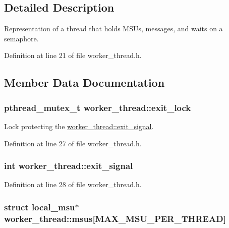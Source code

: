 \subsection{Detailed Description}
Representation of a thread that holds M\-S\-Us, messages, and waits on a semaphore. 

Definition at line 21 of file worker\-\_\-thread.\-h.



\subsection{Member Data Documentation}
\hypertarget{structworker__thread_a92b93bfd566a2cef147993fd851beb30}{
\subsubsection[{exit\-\_\-lock}]{\setlength{\rightskip}{0pt plus 5cm}pthread\-\_\-mutex\-\_\-t worker\-\_\-thread\-::exit\-\_\-lock}}\label{structworker__thread_a92b93bfd566a2cef147993fd851beb30}


Lock protecting the \hyperlink{structworker__thread_a671b6ce2bdb562ebb744b9bcf6764e64}{worker\-\_\-thread\-::exit\-\_\-signal}. 



Definition at line 27 of file worker\-\_\-thread.\-h.

\hypertarget{structworker__thread_a671b6ce2bdb562ebb744b9bcf6764e64}{
\subsubsection[{exit\-\_\-signal}]{\setlength{\rightskip}{0pt plus 5cm}int worker\-\_\-thread\-::exit\-\_\-signal}}\label{structworker__thread_a671b6ce2bdb562ebb744b9bcf6764e64}


Definition at line 28 of file worker\-\_\-thread.\-h.

\hypertarget{structworker__thread_a5b9f22e2454a995f711f92817e5761e2}{
\subsubsection[{msus}]{\setlength{\rightskip}{0pt plus 5cm}struct {\bf local\-\_\-msu}$\ast$ worker\-\_\-thread\-::msus\mbox{[}{\bf M\-A\-X\-\_\-\-M\-S\-U\-\_\-\-P\-E\-R\-\_\-\-T\-H\-R\-E\-A\-D}\mbox{]}}}\label{structworker__thread_a5b9f22e2454a995f711f92817e5761e2}


